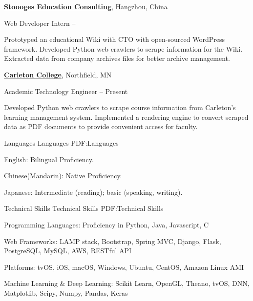 \documentclass[letterpaper,MMMyyyy,nonstopmode]{simpleresumecv}
\begin{document}
\begin{Body}
\BigGap
\Entry
\href{http://stoooges.com/en/}
{\textbf{Stoooges Education Consulting}},
Hangzhou, China


\Gap
\BulletItem
Web Developer Intern
\hfill
{} --
\begin{Detail}
\SubBulletItem
Prototyped an educational Wiki with CTO with open-sourced WordPress framework.
\SubBulletItem
Developed Python web crawlers to scrape information for the Wiki.
\SubBulletItem
Extracted data from company archives files for better archive management.
\end{Detail}

\BigGap
\Entry
\href{http://stoooges.com/en/}
{\textbf{Carleton College}},
Northfield, MN

\Gap
\BulletItem
Academic Technology Engineer
\hfill
{} --
Present
\begin{Detail}
\SubBulletItem
Developed Python web crawlers to scrape course information from Carleton’s learning management system.
\SubBulletItem
Implemented a rendering engine to convert scraped data as PDF documents to provide convenient access for faculty.
\end{Detail}


\Section
{Languages}
{Languages}
{PDF:Languages}

\BulletItem
English: Bilingual Proficiency.

\Gap
\BulletItem
Chinese(Mandarin): Native Proficiency.

\Gap
\BulletItem
Japanese: Intermediate (reading); basic (speaking, writing).


\Section
{Technical Skills}
{Technical Skills}
{PDF:Technical Skills}

\BulletItem
Programming Languages: Proficiency in Python, Java, Javascript, C

\Gap
\BulletItem
Web Frameworks: LAMP stack, Bootstrap, Spring MVC, Django, Flask, PostgreSQL, MySQL, AWS, RESTful API

\Gap
\BulletItem
Platforms: tvOS, iOS, macOS, Windows, Ubuntu, CentOS, Amazon Linux AMI

\Gap
\BulletItem
Machine Learning \& Deep Learning: Scikit Learn, OpenGL, Theano, tvOS, DNN, Matplotlib, Scipy, Numpy, Pandas, Keras



\end{Body}
\end{document}
